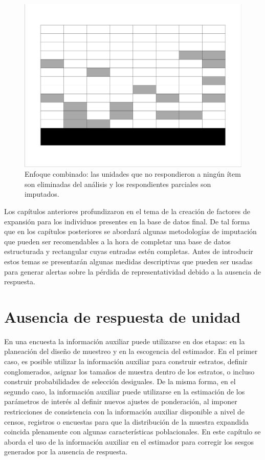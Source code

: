 \documentclass[
  12pt,
  spanish,
]{book}
\begin{document}
\begin{figure}
\includegraphics[width=0.5\linewidth]{Pics/j5} \caption{Enfoque combinado: las unidades que no respondieron a ningún ítem son eliminadas del análisis y los respondientes parciales son imputados.}\label{fig:figenfcomb}
\end{figure}

Los capítulos anteriores profundizaron en el tema de la creación de factores de expansión para los individuos presentes en la base de datos final. De tal forma que en los capítulos posteriores se abordará algunas metodologías de imputación que pueden ser recomendables a la hora de completar una base de datos estructurada y rectangular cuyas entradas estén completas. Antes de introducir estos temas se presentarán algunas medidas descriptivas que pueden ser usadas para generar alertas sobre la pérdida de representatividad debido a la ausencia de respuesta.

\hypertarget{ausencia-de-respuesta-de-unidad}{%
\chapter{Ausencia de respuesta de unidad}\label{ausencia-de-respuesta-de-unidad}}

En una encuesta la información auxiliar puede utilizarse en dos etapas: en la planeación del diseño de muestreo y en la escogencia del estimador. En el primer caso, es posible utilizar la información auxiliar para construir estratos, definir conglomerados, asignar los tamaños de muestra dentro de los estratos, o incluso construir probabilidades de selección desiguales. De la misma forma, en el segundo caso, la información auxiliar puede utilizarse en la estimación de los parámetros de interés al definir nuevos ajustes de ponderación, al imponer restricciones de consistencia con la información auxiliar disponible a nivel de censos, registros o encuestas para que la distribución de la muestra expandida coincida plenamente con algunas características poblacionales. En este capítulo se aborda el uso de la información auxiliar en el estimador para corregir los sesgos generados por la ausencia de respuesta.
\end{document}
